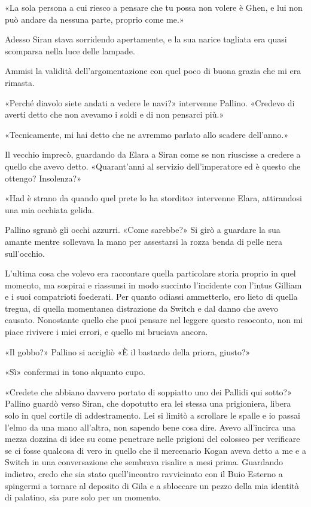 «La sola persona a cui riesco a pensare che tu possa non volere è Ghen,
e lui non può andare da nessuna parte, proprio come me.»

Adesso Siran stava sorridendo apertamente, e la sua narice tagliata era
quasi scomparsa nella luce delle lampade.

Ammisi la validità dell'argomentazione con quel poco di buona grazia che
mi era rimasta.

«Perché diavolo siete andati a vedere le navi?» intervenne Pallino.
«Credevo di averti detto che non avevamo i soldi e di non pensarci più.»

«Tecnicamente, mi hai detto che ne avremmo parlato allo scadere
dell'anno.»

Il vecchio imprecò, guardando da Elara a Siran come se non riuscisse a
credere a quello che avevo detto. «Quarant'anni al servizio
dell'imperatore ed è questo che ottengo? Insolenza?»

«Had è strano da quando quel prete lo ha stordito» intervenne Elara,
attirandosi una mia occhiata gelida.

Pallino sgranò gli occhi azzurri. «Come sarebbe?» Si girò a guardare la
sua amante mentre sollevava la mano per assestarsi la rozza benda di
pelle nera sull'occhio.

L'ultima cosa che volevo era raccontare quella particolare storia
proprio in quel momento, ma sospirai e riassunsi in modo succinto
l'incidente con l'intus Gilliam e i suoi compatrioti foederati. Per
quanto odiassi ammetterlo, ero lieto di quella tregua, di quella
momentanea distrazione da Switch e dal danno che avevo causato.
Nonostante quello che puoi pensare nel leggere questo resoconto, non mi
piace rivivere i miei errori, e quello mi bruciava ancora.

«Il gobbo?» Pallino si accigliò «È il bastardo della priora, giusto?»

«Sì» confermai in tono alquanto cupo.

«Credete che abbiano davvero portato di soppiatto uno dei Pallidi qui
sotto?» Pallino guardò verso Siran, che dopotutto era lei stessa una
prigioniera, libera solo in quel cortile di addestramento. Lei si limitò
a scrollare le spalle e io passai l'elmo da una mano all'altra, non
sapendo bene cosa dire. Avevo all'incirca una mezza dozzina di idee su
come penetrare nelle prigioni del colosseo per verificare se ci fosse
qualcosa di vero in quello che il mercenario Kogan aveva detto a me e a
Switch in una conversazione che sembrava risalire a mesi prima.
Guardando indietro, credo che sia stato quell'incontro ravvicinato con
il Buio Esterno a spingermi a tornare al deposito di Gila e a sbloccare
un pezzo della mia identità di palatino, sia pure solo per un momento.

